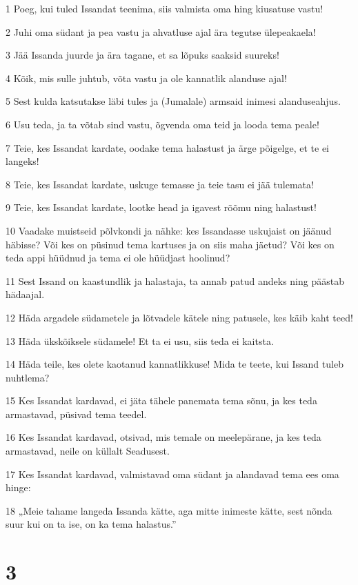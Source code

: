 \par 1 Poeg, kui tuled Issandat teenima, siis valmista oma hing kiusatuse vastu!
\par 2 Juhi oma südant ja pea vastu ja ahvatluse ajal ära tegutse ülepeakaela!
\par 3 Jää Issanda juurde ja ära tagane, et sa lõpuks saaksid suureks!
\par 4 Kõik, mis sulle juhtub, võta vastu ja ole kannatlik alanduse ajal!
\par 5 Sest kulda katsutakse läbi tules ja (Jumalale) armsaid inimesi alanduseahjus.
\par 6 Usu teda, ja ta võtab sind vastu, õgvenda oma teid ja looda tema peale!
\par 7 Teie, kes Issandat kardate, oodake tema halastust ja ärge põigelge, et te ei langeks!
\par 8 Teie, kes Issandat kardate, uskuge temasse ja teie tasu ei jää tulemata!
\par 9 Teie, kes Issandat kardate, lootke head ja igavest rõõmu ning halastust!
\par 10 Vaadake muistseid põlvkondi ja nähke: kes Issandasse uskujaist on jäänud häbisse? Või kes on püsinud tema kartuses ja on siis maha jäetud? Või kes on teda appi hüüdnud ja tema ei ole hüüdjast hoolinud?
\par 11 Sest Issand on kaastundlik ja halastaja, ta annab patud andeks ning päästab hädaajal.
\par 12 Häda argadele südametele ja lõtvadele kätele ning patusele, kes käib kaht teed!
\par 13 Häda ükskõiksele südamele! Et ta ei usu, siis teda ei kaitsta.
\par 14 Häda teile, kes olete kaotanud kannatlikkuse! Mida te teete, kui Issand tuleb nuhtlema?
\par 15 Kes Issandat kardavad, ei jäta tähele panemata tema sõnu, ja kes teda armastavad, püsivad tema teedel.
\par 16 Kes Issandat kardavad, otsivad, mis temale on meelepärane, ja kes teda armastavad, neile on küllalt Seadusest.
\par 17 Kes Issandat kardavad, valmistavad oma südant ja alandavad tema ees oma hinge:
\par 18 „Meie tahame langeda Issanda kätte, aga mitte inimeste kätte, sest nõnda suur kui on ta ise, on ka tema halastus.”

\chapter{3}

